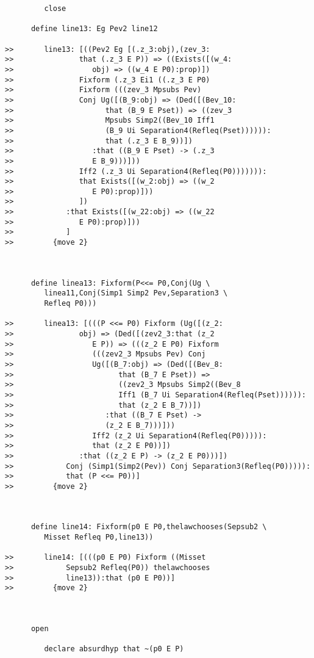 \documentclass[12pt]{article}
\begin{document}
\begin{verbatim}
         close

      define line13: Eg Pev2 line12

>>       line13: [((Pev2 Eg [(.z_3:obj),(zev_3:
>>               that (.z_3 E P)) => ((Exists([(w_4:
>>                  obj) => ((w_4 E P0):prop)])
>>               Fixform (.z_3 Ei1 ((.z_3 E P0)
>>               Fixform (((zev_3 Mpsubs Pev)
>>               Conj Ug([(B_9:obj) => (Ded([(Bev_10:
>>                     that (B_9 E Pset)) => ((zev_3
>>                     Mpsubs Simp2((Bev_10 Iff1
>>                     (B_9 Ui Separation4(Refleq(Pset)))))):
>>                     that (.z_3 E B_9))])
>>                  :that ((B_9 E Pset) -> (.z_3
>>                  E B_9)))]))
>>               Iff2 (.z_3 Ui Separation4(Refleq(P0))))))):
>>               that Exists([(w_2:obj) => ((w_2
>>                  E P0):prop)]))
>>               ])
>>            :that Exists([(w_22:obj) => ((w_22
>>               E P0):prop)]))
>>            ]
>>         {move 2}



      define linea13: Fixform(P<<= P0,Conj(Ug \
         linea11,Conj(Simp1 Simp2 Pev,Separation3 \
         Refleq P0)))

>>       linea13: [(((P <<= P0) Fixform (Ug([(z_2:
>>               obj) => (Ded([(zev2_3:that (z_2
>>                  E P)) => (((z_2 E P0) Fixform
>>                  (((zev2_3 Mpsubs Pev) Conj
>>                  Ug([(B_7:obj) => (Ded([(Bev_8:
>>                        that (B_7 E Pset)) =>
>>                        ((zev2_3 Mpsubs Simp2((Bev_8
>>                        Iff1 (B_7 Ui Separation4(Refleq(Pset)))))):
>>                        that (z_2 E B_7))])
>>                     :that ((B_7 E Pset) ->
>>                     (z_2 E B_7)))]))
>>                  Iff2 (z_2 Ui Separation4(Refleq(P0))))):
>>                  that (z_2 E P0))])
>>               :that ((z_2 E P) -> (z_2 E P0)))])
>>            Conj (Simp1(Simp2(Pev)) Conj Separation3(Refleq(P0))))):
>>            that (P <<= P0))]
>>         {move 2}



      define line14: Fixform(p0 E P0,thelawchooses(Sepsub2 \
         Misset Refleq P0,line13))

>>       line14: [(((p0 E P0) Fixform ((Misset
>>            Sepsub2 Refleq(P0)) thelawchooses
>>            line13)):that (p0 E P0))]
>>         {move 2}



      open

         declare absurdhyp that ~(p0 E P)



\end{verbatim}
\end{document}

